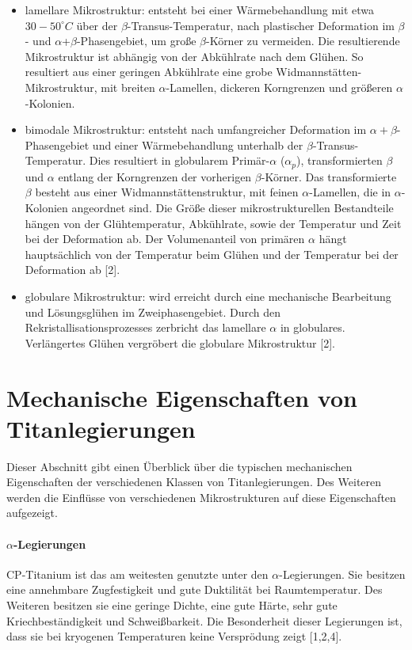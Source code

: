  
\begin{itemize}
	\item lamellare Mikrostruktur: entsteht bei einer Wärmebehandlung mit etwa $30-50 ^\circ C$ über der $\beta$-Transus-Temperatur, nach plastischer Deformation im $\beta$- und $\alpha$+$\beta$-Phasengebiet, um große $\beta$-Körner zu vermeiden. Die resultierende Mikrostruktur ist abhängig von der Abkühlrate nach dem Glühen. So resultiert aus einer geringen Abkühlrate eine grobe Widmannstätten-Mikrostruktur, mit breiten $\alpha$-Lamellen, dickeren Korngrenzen und größeren $\alpha$-Kolonien.
	\item bimodale Mikrostruktur: entsteht nach umfangreicher Deformation im $\alpha+\beta$-Phasengebiet und einer Wärmebehandlung unterhalb der $\beta$-Transus-Temperatur. Dies resultiert in globularem Primär-$\alpha$ ($\alpha_p$), transformierten $\beta$ und $\alpha$ entlang der Korngrenzen der vorherigen $\beta$-Körner. Das transformierte $\beta$ besteht aus einer Widmannstättenstruktur, mit feinen $\alpha$-Lamellen, die in $\alpha$-Kolonien angeordnet sind. Die Größe dieser mikrostrukturellen Bestandteile hängen von der Glühtemperatur, Abkühlrate, sowie der Temperatur und Zeit bei der Deformation ab. Der Volumenanteil von primären $\alpha$ hängt hauptsächlich von der Temperatur beim Glühen und der Temperatur bei der Deformation ab [2].
	\item globulare Mikrostruktur: wird erreicht durch eine mechanische Bearbeitung und Lösungsglühen im Zweiphasengebiet. Durch den Rekristallisationsprozesses zerbricht das lamellare $\alpha$ in globulares. Verlängertes Glühen vergröbert die globulare Mikrostruktur [2].
\end{itemize}




\section{Mechanische Eigenschaften von Titanlegierungen}

Dieser Abschnitt gibt einen Überblick über die typischen mechanischen Eigenschaften der verschiedenen Klassen von Titanlegierungen. Des Weiteren werden die Einflüsse von verschiedenen Mikrostrukturen auf diese Eigenschaften aufgezeigt.

\paragraph{$\alpha$-Legierungen} 
CP-Titanium ist das am weitesten genutzte unter den $\alpha$-Legierungen. Sie besitzen eine annehmbare Zugfestigkeit und gute Duktilität bei Raumtemperatur. Des Weiteren besitzen sie eine geringe Dichte, eine gute Härte, sehr gute Kriechbeständigkeit und Schweißbarkeit. Die Besonderheit dieser Legierungen ist, dass sie bei kryogenen Temperaturen keine Versprödung zeigt [1,2,4].

